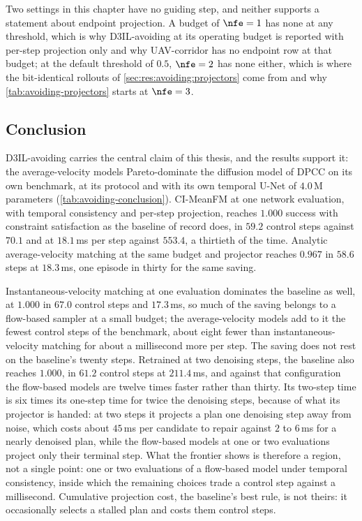 Two settings in this chapter have no guiding step, and neither supports a statement about endpoint
projection. A budget of $\nfe=1$ has none at any threshold, which is why D3IL-avoiding at its operating
budget is reported with per-step projection only and why UAV-corridor has no endpoint row at that budget;
at the default threshold of $0.5$, $\nfe=2$ has none either, which is where the bit-identical rollouts
of \autoref{sec:res:avoiding:projectors} come from and why \autoref{tab:avoiding-projectors} starts at
$\nfe=3$.

\subsection{Conclusion}\label{sec:res:avoiding:conclusion}

D3IL-avoiding carries the central claim of this thesis, and the results support it: the average-velocity models
Pareto-dominate the diffusion model of \ac{DPCC} on its own benchmark, at its protocol and with its own
temporal U-Net of $4.0$\,M parameters (\autoref{tab:avoiding-conclusion}). CI-MeanFM at one network
evaluation, with temporal consistency and per-step projection, reaches $1.000$ success with constraint
satisfaction as the baseline of record does, in $59.2$ control steps against $70.1$ and at $18.1$\,ms per
step against $553.4$, a thirtieth of the time. Analytic average-velocity matching at the same budget and
projector reaches $0.967$ in $58.6$ steps at $18.3$\,ms, one episode in thirty for the same saving.

Instantaneous-velocity matching at one evaluation dominates the baseline as well, at $1.000$ in $67.0$ control
steps and $17.3$\,ms, so much of the saving belongs to a flow-based sampler at a small budget; the
average-velocity models add to it the fewest control steps of the benchmark, about eight fewer than
instantaneous-velocity matching for about a millisecond more per step. The saving does not rest on the
baseline's twenty steps. Retrained at two denoising steps, the baseline also reaches $1.000$, in $61.2$
control steps at $211.4$\,ms, and against that configuration the flow-based models are twelve times faster
rather than thirty. Its two-step time is six times its one-step time for twice the denoising steps, because
of what its projector is handed: at two steps it projects a plan one denoising step away from noise, which costs about $45$\,ms per candidate to repair against $2$ to
$6$\,ms for a nearly denoised plan, while the flow-based models at one or two evaluations project only their
terminal step. What the frontier shows is therefore a region, not a single point: one or two evaluations of
a flow-based model under temporal consistency, inside which the remaining choices trade a control step
against a millisecond. Cumulative projection cost, the baseline's best rule, is not theirs: it occasionally
selects a stalled plan and costs them control steps.

